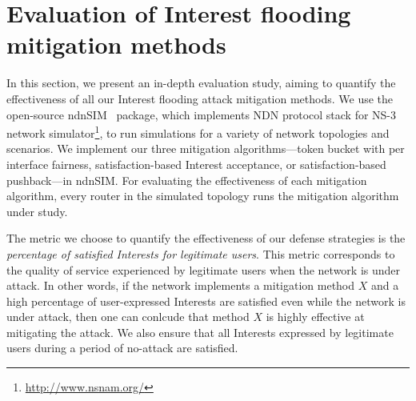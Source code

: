 \section{Evaluation of Interest flooding mitigation methods}
\label{sec:evaluation}




In this section, we present an in-depth evaluation study, aiming to quantify the effectiveness of all our Interest flooding attack mitigation methods.
We use the open-source ndnSIM~\cite{ndnsim} package, which implements NDN protocol stack for NS-3 network simulator\footnote{\url{http://www.nsnam.org/}}, to run simulations for a variety of network topologies and scenarios. We implement our three mitigation algorithms---token bucket with per interface fairness, satisfaction-based Interest acceptance, or satisfaction-based pushback---in ndnSIM. For evaluating the effectiveness of each mitigation algorithm, every router in the simulated topology runs the mitigation algorithm under study.



The metric we choose to quantify the effectiveness of our defense strategies is the {\it percentage of satisfied Interests for legitimate users}. This metric corresponds to the quality of service experienced by legitimate users when the network is under attack. In other words, if the network implements a mitigation method $X$ and a high percentage of user-expressed Interests are satisfied even while the network is under attack, then one can conlcude that method $X$ is highly effective at mitigating the attack. We also ensure that all Interests expressed by legitimate users during a period of no-attack are satisfied.
 
